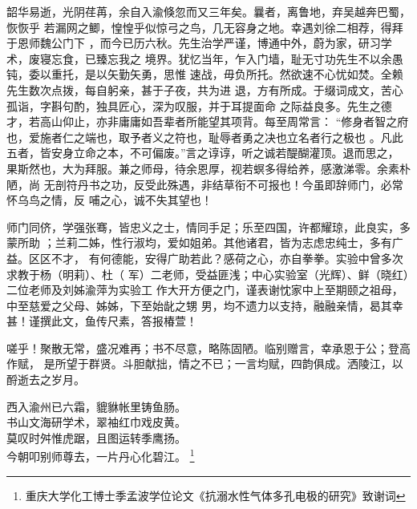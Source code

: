 \begin{ack}

韶华易逝，光阴荏苒，余自入渝倏忽而又三年矣。曩者，离鲁地，弃吴越奔巴蜀，恢恢乎
若漏网之鲫，惶惶乎似惊弓之鸟，几无容身之地。幸遇刘徐二相荐，得拜于恩师魏公门下
，而今已历六秋。先生治学严谨，博通中外，蔚为家，研习学术，废寝忘食，已臻忘我之
境界。犹忆当年，乍入门墙，耻无寸功先生不以余愚钝，委以重托，是以矢勤矢勇，思惟
速战，毋负所托。然欲速不心忧如焚。全赖先生数次点拨，每自躬亲，甚于子夜，共为进
退，方有所成。于缀词成文，苦心孤诣，字斟句酌，独具匠心，深为叹服，并于耳提面命
之际益良多。先生之德才，若高山仰止，亦非庸庸如吾辈者所能望其项背。每至周常言：
“修身者智之府也，爱施者仁之端也，取予者义之符也，耻辱者勇之决也立名者行之极也
。凡此五者，皆安身立命之本，不可偏废。”言之谆谆，听之诚若醍醐灌顶。退而思之，
果斯然也，大为拜服。兼之师母，待余恩厚，视若螟多得给养，感激涕零。余素朴陋，尚
无剖符丹书之功，反受此殊遇，非结草衔不可报也！今虽即辞师门，必常怀乌鸟之情，反
哺之心，诚不失其望也！

师门同侪，学强张骞，皆忠义之士，情同手足；乐至四国，许都耀琼，此良实，多蒙所助
；兰莉二姊，性行淑均，爱如姐弟。其他诸君，皆为志虑忠纯士，多有广益。区区不才，
有何德能，安得广助若此？感荷之心，亦自拳拳。实验中曾多次求教于杨（明莉）、杜（
军）二老师，受益匪浅；中心实验室（光辉）、鲜（晓红）二位老师及刘姊渝萍为实验工
作大开方便之门，谨表谢忱家中上至期颐之祖母，中至慈爱之父母、姊姊，下至始龀之甥
男，均不遗力以支持，融融亲情，曷其幸甚！谨撰此文，鱼传尺素，答报椿萱！

嗟乎！聚散无常，盛况难再；书不尽意，略陈固陋。临别赠言，幸承恩于公；登高作赋，
是所望于群贤。斗胆献拙，情之不已；一言均赋，四韵俱成。洒陵江，以酹逝去之岁月。

\begin{center}
西入渝州已六霜，貔貅帐里铸鱼肠。\\
书山文海研学术，翠袖红巾戏皮黄。\\
莫叹时舛惟虎踞，且图运转季鹰扬。\\
今朝叩别师尊去，一片丹心化碧江。
\footnote{重庆大学化工博士季孟波学位论文《抗溺水性气体多孔电极的研究》致谢词}
\end{center}

\vspace{2em}

\end{ack}
